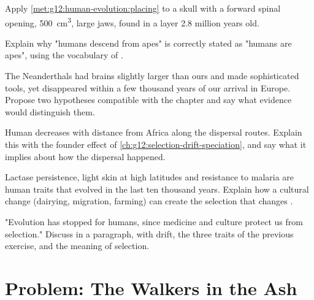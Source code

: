 \begin{exercise}[$\star\star$]\label{exo:g12:human-evolution:10}
Apply \cref{met:g12:human-evolution:placing} to a skull with a
forward spinal opening, \qty{500}{cm^3}, large jaws, found in a layer
2.8 million years old.
\end{exercise}

\begin{exercise}[$\star\star$]\label{exo:g12:human-evolution:11}
Explain why "humans descend from apes" is correctly stated as "humans
are apes", using the vocabulary of .
\end{exercise}

\begin{exercise}[$\star\star\star$]\label{exo:g12:human-evolution:12}
The Neanderthals had brains slightly larger than ours and made
sophisticated tools, yet disappeared within a few thousand years of
our arrival in Europe. Propose two hypotheses compatible with the
chapter and say what evidence would distinguish them.
\end{exercise}

\begin{exercise}[$\star\star\star$]\label{exo:g12:human-evolution:13}
Human  decreases with distance from Africa along the
dispersal routes. Explain this with the founder effect of
\cref{ch:g12:selection-drift-speciation}, and say what it implies
about how the dispersal happened.
\end{exercise}

\begin{exercise}[$\star\star\star$]\label{exo:g12:human-evolution:14}
Lactase persistence, light skin at high latitudes and resistance to
malaria are human traits that evolved in the last ten thousand years.
Explain how a cultural change (dairying, migration, farming) can
create the selection that changes .
\end{exercise}

\begin{exercise}[$\star\star\star$]\label{exo:g12:human-evolution:15}
"Evolution has stopped for humans, since medicine and culture protect
us from selection." Discuss in a paragraph, with drift, the three
traits of the previous exercise, and the meaning of selection.
\end{exercise}

\section{Problem: The Walkers in the Ash}

